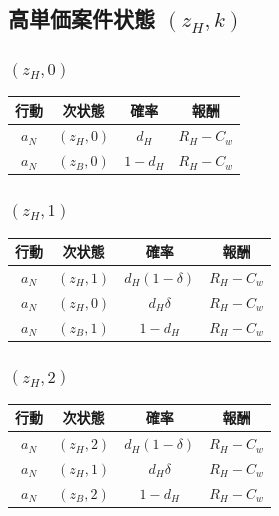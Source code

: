 \documentclass[11pt,a4paper]{bxjsarticle}
\begin{document}
\subsection{高単価案件状態 \((z_H,k)\)}

\subsubsection*{\((z_H,0)\)}
\begin{table}[H]
\centering
\begin{tabular}{cccc}
\toprule
行動 & 次状態 & 確率 & 報酬 \\
\midrule
\(a_N\) & \((z_H,0)\) & \(d_H\) & \(R_H-C_w\) \\
\(a_N\) & \((z_B,0)\) & \(1-d_H\) & \(R_H-C_w\) \\
\bottomrule
\end{tabular}
\end{table}

\subsubsection*{\((z_H,1)\)}
\begin{table}[H]
\centering
\begin{tabular}{cccc}
\toprule
行動 & 次状態 & 確率 & 報酬 \\
\midrule
\(a_N\) & \((z_H,1)\) & \(d_H(1-\delta)\) & \(R_H-C_w\) \\
\(a_N\) & \((z_H,0)\) & \(d_H\delta\) & \(R_H-C_w\) \\
\(a_N\) & \((z_B,1)\) & \(1-d_H\) & \(R_H-C_w\) \\
\bottomrule
\end{tabular}
\end{table}

\subsubsection*{\((z_H,2)\)}
\begin{table}[H]
\centering
\begin{tabular}{cccc}
\toprule
行動 & 次状態 & 確率 & 報酬 \\
\midrule
\(a_N\) & \((z_H,2)\) & \(d_H(1-\delta)\) & \(R_H-C_w\) \\
\(a_N\) & \((z_H,1)\) & \(d_H\delta\) & \(R_H-C_w\) \\
\(a_N\) & \((z_B,2)\) & \(1-d_H\) & \(R_H-C_w\) \\
\bottomrule
\end{tabular}
\end{table}
\end{document}
